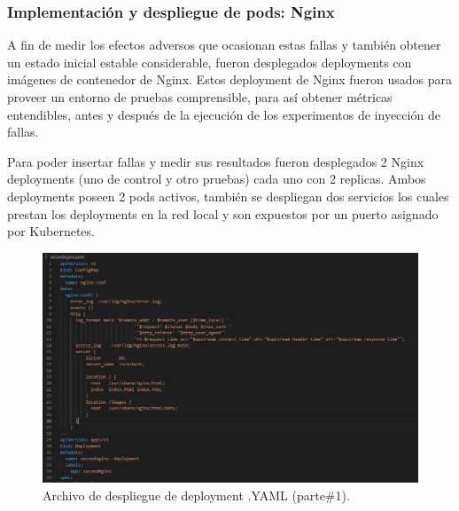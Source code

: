 \subsubsection{Implementación y despliegue de pods: Nginx}

\par A fin de medir los efectos adversos que ocasionan estas fallas y también obtener un estado inicial estable considerable, fueron desplegados deployments con imágenes de contenedor de Nginx. Estos deployment de Nginx fueron usados para proveer un entorno de pruebas comprensible, para así obtener métricas entendibles, antes y después de la ejecución de los experimentos de inyección de fallas.\\

\par Para poder insertar fallas y medir sus resultados fueron desplegados 2 Nginx deployments (uno de control y otro pruebas) cada uno con 2 replicas. Ambos deployments poseen 2 pods activos, también se despliegan dos servicios los cuales prestan los deployments en la red local y son expuestos por un puerto asignado por Kubernetes. 

\begin{figure}[htpb!]
	\centering
	\includegraphics[width=0.95\columnwidth]{images/captures/podnginx/second01.PNG}
	\caption{Archivo de despliegue de deployment .YAML (parte\#1).}
	\label{fig:yml01}
\end{figure}

